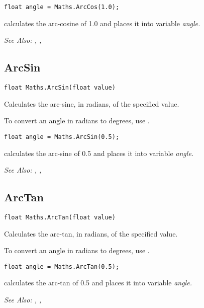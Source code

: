 \begin{verbatim}
float angle = Maths.ArcCos(1.0);
\end{verbatim}
calculates the arc-cosine of 1.0 and places it into variable \it{angle}.

\it{See Also:} ,
,


\subsection{ArcSin}\label{Maths.ArcSin}%

\begin{verbatim}
float Maths.ArcSin(float value)
\end{verbatim}
Calculates the arc-sine, in radians, of the specified value.

To convert an angle in radians to degrees, use .

\begin{verbatim}
float angle = Maths.ArcSin(0.5);
\end{verbatim}
calculates the arc-sine of 0.5 and places it into variable \it{angle}.

\it{See Also:} ,
,


\subsection{ArcTan}\label{Maths.ArcTan}%

\begin{verbatim}
float Maths.ArcTan(float value)
\end{verbatim}
Calculates the arc-tan, in radians, of the specified value.

To convert an angle in radians to degrees, use .

\begin{verbatim}
float angle = Maths.ArcTan(0.5);
\end{verbatim}
calculates the arc-tan of 0.5 and places it into variable \it{angle}.

\it{See Also:} ,
,


